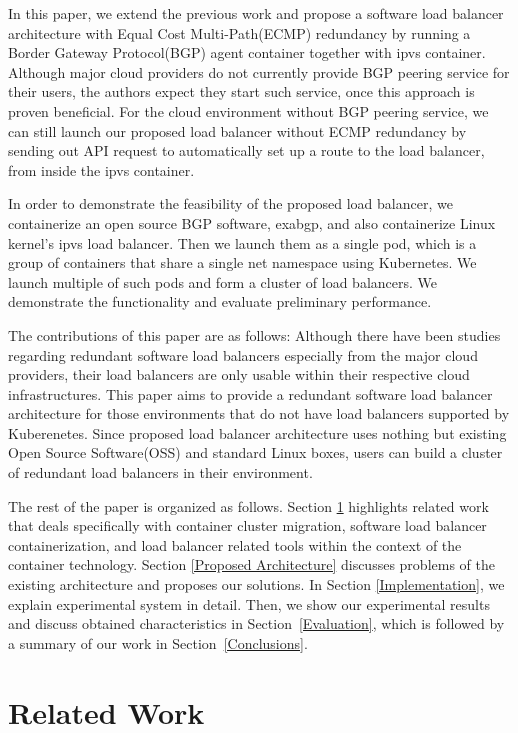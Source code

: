 In this paper, we extend the previous work and propose a software load balancer architecture with Equal Cost Multi-Path(ECMP)\cite{thaler2000multipath} redundancy by running a Border Gateway Protocol(BGP) agent container together with ipvs container.
Although major cloud providers do not currently provide BGP peering service for their users, the authors expect they start such service, once this approach is proven beneficial.
For the cloud environment without BGP peering service, we can still launch our proposed load balancer without ECMP redundancy by sending out API request to automatically set up a route to the load balancer, from inside the ipvs container.

In order to demonstrate the feasibility of the proposed load balancer, we containerize an open source BGP software, exabgp\cite{exa-networks_2018}, and also containerize Linux kernel's ipvs load balancer. Then we launch them as a single pod, which is a group of containers that share a single net namespace using Kubernetes. We launch multiple of such pods and form a cluster of load balancers.
We demonstrate the functionality and evaluate preliminary performance.

The contributions of this paper are as follows:
Although there have been studies regarding redundant software load balancers especially from the major cloud providers\cite{eisenbud2016maglev,patel2013ananta}, their load balancers are only usable within their respective cloud infrastructures.
This paper aims to provide a redundant software load balancer architecture for those environments that do not have load balancers supported by Kuberenetes.
Since proposed load balancer architecture uses nothing but existing Open Source Software(OSS) and standard Linux boxes, users can build a cluster of redundant load balancers in their environment.

The rest of the paper is organized as follows.
Section \ref{Related Work} highlights related work that deals specifically with container cluster migration,
software load balancer containerization, and load balancer related tools within the context of the container technology.
Section \ref{Proposed Architecture} discusses problems of the existing architecture and proposes our solutions.
In Section \ref{Implementation}, we explain experimental system in detail.
Then, we show our experimental results and discuss obtained characteristics in Section~\ref{Evaluation}, which is followed by a summary of our work in Section~\ref{Conclusions}.

\section{Related Work}\label{Related Work}

